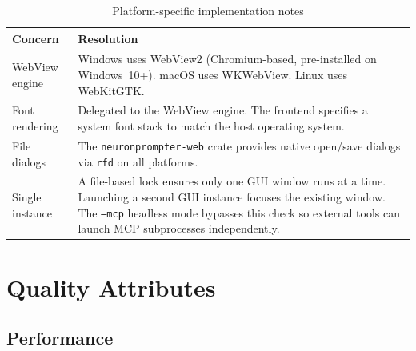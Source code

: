 \documentclass[a4paper, 11pt, oneside]{report}
\begin{document}
\begin{table}[H]
  \centering
  \caption{Platform-specific implementation notes}
  \label{tab:platform-notes}
  \begin{tabularx}{\textwidth}{l X}
    \toprule
    \textbf{Concern} & \textbf{Resolution} \\
    \midrule
    WebView engine  & Windows uses WebView2 (Chromium-based, pre-installed on
                      Windows~10+).  macOS uses WKWebView.  Linux uses WebKitGTK. \\
    Font rendering  & Delegated to the WebView engine.  The frontend specifies
                      a system font stack to match the host operating system. \\
    File dialogs    & The \texttt{neuronprompter-web} crate provides native open/save
                      dialogs via \texttt{rfd} on all platforms. \\
    Single instance & A file-based lock ensures only one
                      GUI window runs at a time.  Launching a second GUI
                      instance focuses the existing window.  The
                      \texttt{--mcp} headless mode bypasses this check so
                      external tools can launch MCP subprocesses
                      independently. \\
    \bottomrule
  \end{tabularx}
\end{table}


\chapter{Quality Attributes}
\label{ch:quality}

\section{Performance}
\label{sec:performance}
\end{document}
